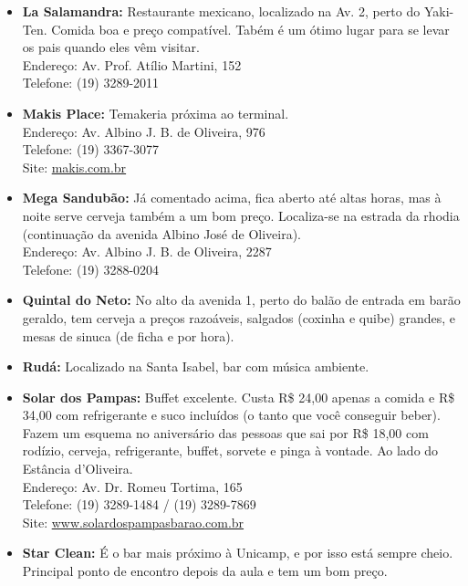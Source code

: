 \begin{itemize}
    \item   \textbf{La Salamandra:} Restaurante mexicano, localizado na Av. 2,
        perto do Yaki-Ten. Comida boa e preço compatível. Tabém é um ótimo lugar
        para se levar os pais quando eles vêm visitar.
        \\Endereço: Av. Prof. Atílio Martini, 152
        \\Telefone: (19) 3289-2011

    \item   \textbf{Makis Place:} Temakeria próxima ao terminal.
        \\Endereço: Av. Albino J. B. de Oliveira, 976
        \\Telefone: (19) 3367-3077
        \\Site: \url{makis.com.br}

    \item   \textbf{Mega Sandubão:} Já comentado acima, fica aberto até altas
        horas, mas à noite serve cerveja também a um bom preço. Localiza-se na
        estrada da rhodia (continuação da avenida Albino José de Oliveira).
        \\Endereço: Av. Albino J. B. de Oliveira, 2287
        \\Telefone: (19) 3288-0204

    \item   \textbf{Quintal do Neto:} No alto da avenida 1, perto do balão de
        entrada em barão geraldo, tem cerveja a preços razoáveis, salgados
        (coxinha e quibe) grandes, e mesas de sinuca (de ficha e por hora).

    \item   \textbf{Rudá:} Localizado na Santa Isabel, bar com música ambiente.

    \item   \textbf{Solar dos Pampas:} Buffet excelente. Custa R\$ 24,00 apenas
        a comida e R\$ 34,00 com refrigerante e suco incluídos (o tanto que você
        conseguir beber). Fazem um esquema no aniversário das pessoas que sai
        por R\$ 18,00 com rodízio, cerveja, refrigerante, buffet, sorvete e
        pinga à vontade. Ao lado do Estância d'Oliveira.
        \\Endereço: Av. Dr. Romeu Tortima, 165
        \\Telefone: (19) 3289-1484 / (19) 3289-7869
        \\Site: \url{www.solardospampasbarao.com.br}

    \item   \textbf{Star Clean:} É o bar mais próximo à Unicamp, e por isso está
        sempre cheio. Principal ponto de encontro depois da aula e tem um bom
        preço.


\end{itemize}
